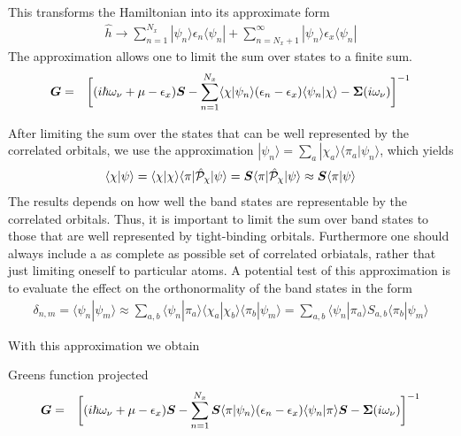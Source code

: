 \documentclass[11pt,a4paper]{report}
\begin{document}
This transforms the Hamiltonian into its approximate form
\begin{eqnarray}
\hat{h}\rightarrow\sum_{n=1}^{N_x}|\psi_n\rangle \epsilon_n\langle\psi_n|
+\sum_{n=N_x+1}^\infty|\psi_n\rangle \epsilon_x\langle\psi_n|
\end{eqnarray}
The approximation allows one to limit the sum over states to a finite sum.
\begin{eqnarray}
\bm{G}&=&
\biggl[(i\hbar\omega_\nu+\mu-\epsilon_x)\bm{S}-\sum_{n=1}^{N_x}
\langle\chi|\psi_n\rangle (\epsilon_n-\epsilon_x)\langle\psi_n|\chi\rangle-\bm{\Sigma}(i\omega_\nu)\biggr]^{-1}
\end{eqnarray}


After limiting the sum over the states that can be well represented by
the correlated orbitals, we use the approximation
$|\psi_n\rangle=\sum_a|\chi_a\rangle\langle\pi_a|\psi_n\rangle$, which
yields
\begin{eqnarray}
\langle\chi|\psi\rangle
=\langle\chi|\chi\rangle\langle\pi|\hat{\mathcal{P}}_\chi|\psi\rangle
=\bm{S}\langle\pi|\hat{\mathcal{P}}_\chi|\psi\rangle
\approx 
\bm{S}\langle\pi|\psi\rangle
\end{eqnarray}
The results depends on how well the band states are representable by
the correlated orbitals. Thus, it is important to limit the sum over
band states to those that are well represented by tight-binding
orbitals. Furthermore one should always include a as complete as
possible set of correlated orbiatals, rather that just limiting
oneself to particular atoms. A potential test of this approximation is
to evaluate the effect on the orthonormality of the band states in the
form 
\begin{eqnarray}
\delta_{n,m}=\langle\psi_n|\psi_m\rangle
\approx\sum_{a,b}
\langle\psi_n|\pi_a\rangle\langle\chi_a|\chi_b\rangle\langle\pi_b|\psi_m\rangle
=\sum_{a,b}
\langle\psi_n|\pi_a\rangle S_{a,b} \langle\pi_b|\psi_m\rangle
\end{eqnarray}
  
With this approximation we obtain
\begin{myshadowminipage}{Greens function projected}
\begin{eqnarray}
\bm{G}&=&
\biggl[(i\hbar\omega_\nu+\mu-\epsilon_x)\bm{S}-\sum_{n=1}^{N_x}
\bm{S}\langle\pi|\psi_n\rangle (\epsilon_n-\epsilon_x)\langle\psi_n|\pi\rangle\bm{S}-\bm{\Sigma}(i\omega_\nu)\biggr]^{-1}
\end{eqnarray}
\end{myshadowminipage}
\end{document}
